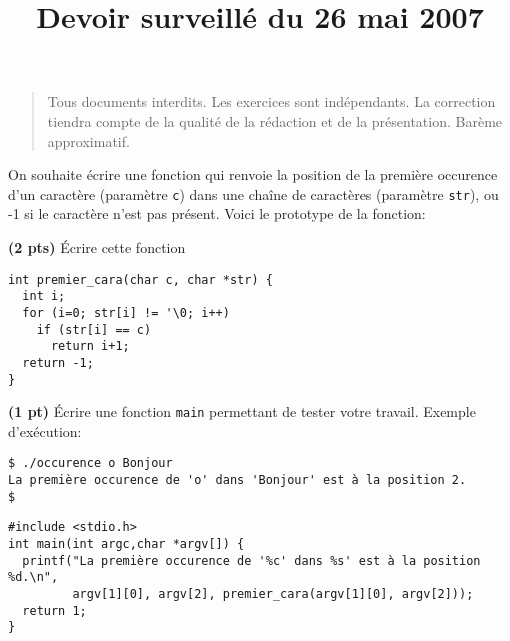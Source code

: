 \documentclass[10pt]{article}
\title{Devoir surveillé du 26 mai 2007}
\begin{document}
\maketitle
\thispagestyle{empty}

\begin{quote}
  Tous documents interdits. Les exercices sont indépendants. La correction
  tiendra compte de la qualité de la rédaction et de la présentation. Barème
  approximatif.
\end{quote}


\begin{Exercice} 
  On souhaite écrire une fonction qui renvoie la position de la première
  occurence d'un caractère (paramètre \texttt{c}) dans une chaîne de caractères
  (paramètre \texttt{str}), ou -1 si le caractère n'est pas présent. Voici le
  prototype de la fonction:

\Question \textbf{(2 pts)} Écrire cette fonction

\begin{Reponse}
  \begin{Verbatim}
int premier_cara(char c, char *str) {
  int i;
  for (i=0; str[i] != '\0; i++) 
    if (str[i] == c) 
      return i+1;
  return -1;
}
  \end{Verbatim}
\end{Reponse}
\Question \textbf{(1 pt)} Écrire une fonction \texttt{main} permettant de tester votre
travail. Exemple d'exécution:
\begin{Verbatim}
$ ./occurence o Bonjour
La première occurence de 'o' dans 'Bonjour' est à la position 2.
$  
\end{Verbatim}
\begin{Reponse}
  \begin{Verbatim}
#include <stdio.h>
int main(int argc,char *argv[]) {    
  printf("La première occurence de '%c' dans %s' est à la position %d.\n",
         argv[1][0], argv[2], premier_cara(argv[1][0], argv[2]));
  return 1;        
}
  \end{Verbatim}
\end{Reponse}
\end{Exercice}
\end{document}
